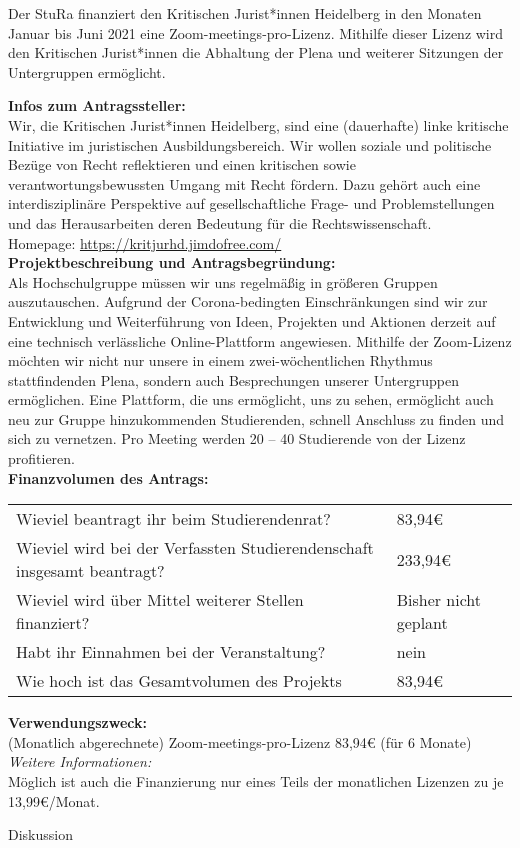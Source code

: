 {
    Der StuRa finanziert den Kritischen Jurist*innen Heidelberg in den Monaten Januar bis Juni 2021 eine Zoom-meetings-pro-Lizenz. Mithilfe dieser Lizenz wird den Kritischen Jurist*innen die Abhaltung der Plena und weiterer Sitzungen der Untergruppen ermöglicht.
}{
    \textbf{Infos zum Antragssteller:}\\
    Wir, die Kritischen Jurist*innen Heidelberg, sind eine (dauerhafte) linke kritische Initiative im juristischen Ausbildungsbereich. Wir wollen soziale und politische Bezüge von Recht reflektieren und einen kritischen sowie verantwortungsbewussten Umgang mit Recht fördern. Dazu gehört auch eine interdisziplinäre Perspektive auf gesellschaftliche Frage- und Problemstellungen und das Herausarbeiten deren Bedeutung für die Rechtswissenschaft.\\
    Homepage: \url{https://kritjurhd.jimdofree.com/}\\[1em]
    \textbf{Projektbeschreibung und Antragsbegründung:}\\
    Als Hochschulgruppe müssen wir uns regelmäßig in größeren Gruppen auszutauschen. Aufgrund der Corona-bedingten Einschränkungen sind wir zur Entwicklung und Weiterführung von Ideen, Projekten und Aktionen derzeit auf eine technisch verlässliche Online-Plattform angewiesen. Mithilfe der Zoom-Lizenz möchten wir nicht nur unsere in einem zwei-wöchentlichen Rhythmus stattfindenden Plena, sondern auch Besprechungen unserer Untergruppen ermöglichen. Eine Plattform, die uns ermöglicht, uns zu sehen, ermöglicht auch neu zur Gruppe hinzukommenden Studierenden, schnell Anschluss zu finden und sich zu vernetzen. Pro Meeting werden 20 – 40 Studierende von der Lizenz profitieren.\\[1em]
    \textbf{Finanzvolumen des Antrags:}\\
    \begin{tabular}{l l}
        Wieviel beantragt ihr beim Studierendenrat?                             & 83,94€       \\
        Wieviel wird bei der Verfassten Studierendenschaft insgesamt beantragt? & 233,94€    \\
        Wieviel wird über Mittel weiterer Stellen finanziert?                   & Bisher nicht geplant      \\
        Habt ihr Einnahmen bei der Veranstaltung?                               & nein \\
        Wie hoch ist das Gesamtvolumen des Projekts                             & 83,94€\\
    \end{tabular}
    \newline
    \textbf{Verwendungszweck:}\\
    (Monatlich abgerechnete) Zoom-meetings-pro-Lizenz 83,94€ (für 6 Monate)
    \emph{Weitere Informationen:}\\
    Möglich ist auch die Finanzierung nur eines Teils der monatlichen Lizenzen zu je 13,99€/Monat.
}{
    Diskussion
}
